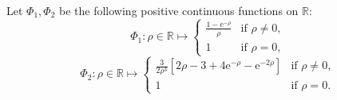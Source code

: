 \documentclass[preprint,EJP]{ejpecp}
\begin{document}
\noindent Let $\Phi_1,\Phi_2$ be the following positive continuous functions on $\mathbb{R}$:
\begin{equation}\label{Phi_1}
\Phi_1:\rho\in\mathbb{R}\mapsto\begin{cases}
  \frac{1-\mathrm{e}^{-\rho}}{\rho}&\text{if $\rho\neq0$,}\\ 
  1 & \text{if $\rho=0$,} 
\end{cases}
\end{equation}
\begin{equation}\label{Phi_2}
\Phi_2:\rho\in\mathbb{R}\mapsto\begin{cases}
  \frac{3}{2 \rho^3}\left[2\rho-3+4 \mathrm{e}^{-\rho}-\mathrm{e}^{-2\rho}\right] & \text{if $\rho\neq0$,}\\
  1 &\text{if $\rho=0$.}
\end{cases}
\end{equation}
 
\end{document}
